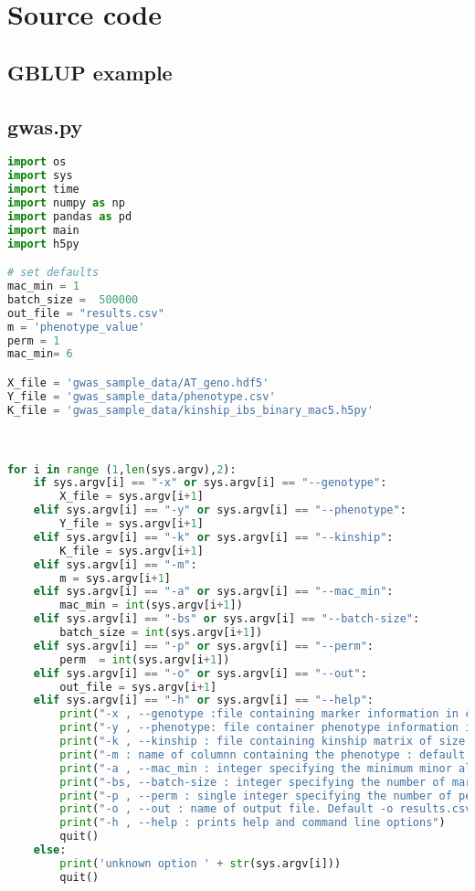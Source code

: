 

\chapter{Source code} %

\label{AppendixA} %
\section{GBLUP example}

\linespread{1.5} 
\section{gwas.py}
\begin{lstlisting}[language=Python]
import os
import sys
import time
import numpy as np
import pandas as pd
import main
import h5py

# set defaults 
mac_min = 1
batch_size =  500000 
out_file = "results.csv"
m = 'phenotype_value'
perm = 1
mac_min= 6

X_file = 'gwas_sample_data/AT_geno.hdf5'
Y_file = 'gwas_sample_data/phenotype.csv'
K_file = 'gwas_sample_data/kinship_ibs_binary_mac5.h5py'



for i in range (1,len(sys.argv),2):
    if sys.argv[i] == "-x" or sys.argv[i] == "--genotype":
        X_file = sys.argv[i+1]
    elif sys.argv[i] == "-y" or sys.argv[i] == "--phenotype":
        Y_file = sys.argv[i+1]
    elif sys.argv[i] == "-k" or sys.argv[i] == "--kinship":
        K_file = sys.argv[i+1]
    elif sys.argv[i] == "-m":
        m = sys.argv[i+1]
    elif sys.argv[i] == "-a" or sys.argv[i] == "--mac_min":
        mac_min = int(sys.argv[i+1])
    elif sys.argv[i] == "-bs" or sys.argv[i] == "--batch-size":
        batch_size = int(sys.argv[i+1])
    elif sys.argv[i] == "-p" or sys.argv[i] == "--perm":
        perm  = int(sys.argv[i+1])
    elif sys.argv[i] == "-o" or sys.argv[i] == "--out":
        out_file = sys.argv[i+1]
    elif sys.argv[i] == "-h" or sys.argv[i] == "--help":
        print("-x , --genotype :file containing marker information in csv or hdf5 format of size")
        print("-y , --phenotype: file container phenotype information in csv format"  )
        print("-k , --kinship : file containing kinship matrix of size k X k in csv or hdf5 format")
        print("-m : name of columnn containing the phenotype : default m = phenotype_value")
        print("-a , --mac_min : integer specifying the minimum minor allele count necessary for a marker to be included. Default a = 1" )
        print("-bs, --batch-size : integer specifying the number of markers processed at once. Default -bs 500000" )
        print("-p , --perm : single integer specifying the number of permutations. Default 1 == no perm ")
        print("-o , --out : name of output file. Default -o results.csv  ")
        print("-h , --help : prints help and command line options")
        quit()
    else:
        print('unknown option ' + str(sys.argv[i]))
        quit()




\end{lstlisting}
